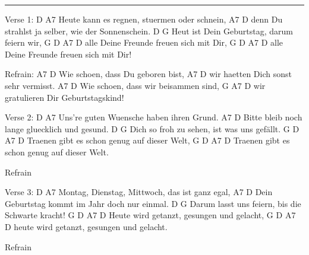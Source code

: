\noindent\rule{\columnwidth}{1pt}

\begin{multicols}{2}
\begin{lstsong}
Verse 1:
D                     A7
Heute kann es regnen, stuermen oder schnein,
A7                          D
denn Du strahlst ja selber, wie der Sonnenschein.
D                         G
Heut ist Dein Geburtstag, darum feiern wir,
G          D       A7              D
alle Deine Freunde freuen sich mit Dir,
G          D       A7              D
alle Deine Freunde freuen sich mit Dir!

Refrain:
    A7                D
Wie schoen, dass Du geboren bist,
    A7                 D
wir haetten Dich sonst sehr vermisst.
    A7                  D
Wie schoen, dass wir beisammen sind,
    G           A7             D
wir gratulieren Dir Geburtstagskind!
\end{lstsong}\vfill\columnbreak\begin{lstsong}
Verse 2:
D                     A7
Uns're guten Wuensche haben ihren Grund.
A7                     D
Bitte bleib noch lange gluecklich und gesund.
D                      G
Dich so froh zu sehen, ist was uns gefällt.
G               D       A7             D
Traenen gibt es schon genug auf dieser Welt,
G               D       A7             D
Traenen gibt es schon genug auf dieser Welt.

Refrain

Verse 3:
D                           A7
Montag, Dienstag, Mittwoch, das ist ganz egal,
A7                       D
Dein Geburtstag kommt im Jahr doch nur einmal.
D                       G
Darum lasst uns feiern, bis die Schwarte kracht!
G            D        A7           D
Heute wird getanzt, gesungen und gelacht,
G            D        A7           D
heute wird getanzt, gesungen und gelacht.

Refrain
\end{lstsong}
\end{multicols}
\newpage

